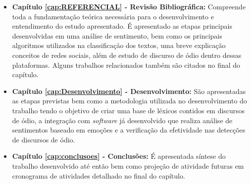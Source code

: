 \begin{itemize}

\item \textbf{Capítulo \ref{cap:REFERENCIAL} - Revisão Bibliográfica:} Compreende toda a fundamentação teórica necessária para o desenvolvimento e entendimento do estudo apresentado. É apresentado as etapas principais desenvolvidas em uma análise de sentimento, bem como os principais algoritmos utilizados na classificação dos textos, uma breve explicação conceitos de redes sociais, além de estudo de discurso de ódio dentro dessas plataformas. Alguns trabalhos relacionados também são citados no final do capítulo.

\item \textbf{Capítulo \ref{cap:Desenvolvimento} - Desenvolvimento:} São apresentadas as etapas previstas bem como a metodologia utilizada no desenvolvimento do trabalho tendo o objetivo de criar uma base de léxicos contidos em discursos de ódio, a integração com \textit{software} já desenvolvido que realiza análise de sentimentos baseado em emoções e a verificação da efetividade nas detecções de discursos de ódio.

\item \textbf{Capítulo \ref{cap:conclusoes} - Conclusões:} É apresentada síntese do trabalho desenvolvido até então bem como projeção de atividade futuras em cronograma de atividades detalhado no final do capítulo.
\end{itemize}
